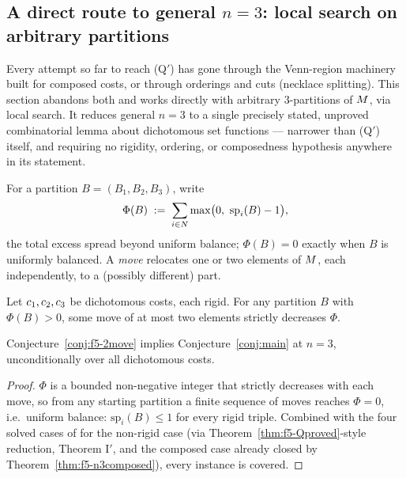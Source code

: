 \subsection{A direct route to general $n = 3$: local search on arbitrary partitions}
\label{sec:f5-2move}

Every attempt so far to reach (Q$'$) has gone through the Venn-region machinery
built for composed costs, or through orderings and cuts (necklace splitting).
This section abandons both and works directly with arbitrary $3$-partitions of
$M$, via local search. It reduces general $n = 3$ to a single precisely
stated, unproved combinatorial lemma about dichotomous set functions ---
narrower than (Q$'$) itself, and requiring no rigidity, ordering, or
composedness hypothesis anywhere in its statement.

For a partition $B = (B_1,B_2,B_3)$, write
\[
  \Phi(B) \;:=\; \sum_{i \in N} \max\bigl(0,\ \mathrm{sp}_i(B) - 1\bigr),
\]
the total excess spread beyond uniform balance; $\Phi(B) = 0$ exactly when $B$
is uniformly balanced. A \emph{move} relocates one or two elements of $M$,
each independently, to a (possibly different) part.

\begin{conjecture}
\label{conj:f5-2move}
Let $c_1,c_2,c_3$ be dichotomous costs, each rigid. For any
partition $B$ with $\Phi(B) > 0$, some move of at most two elements strictly
decreases $\Phi$.
\end{conjecture}

\begin{proposition}
\label{prop:f5-2move-suffices}
Conjecture~\ref{conj:f5-2move} implies Conjecture~\ref{conj:main} at $n = 3$,
unconditionally over all dichotomous costs.
\end{proposition}

\begin{proof}
$\Phi$ is a bounded non-negative integer that strictly decreases with each
move, so from any starting partition a finite sequence of moves reaches
$\Phi = 0$, i.e.\ uniform balance: $\mathrm{sp}_i(B) \le 1$ for every rigid
triple. Combined with the four solved cases of  for the
non-rigid case (via Theorem~\ref{thm:f5-Qproved}-style reduction, Theorem
I$'$, and the composed case already closed by
Theorem~\ref{thm:f5-n3composed}), every instance is covered.
\end{proof}

